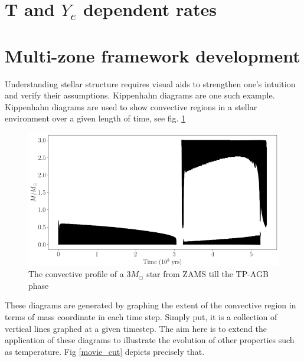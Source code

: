\documentclass{article}
\begin{document}
\section*{T and $Y_{e}$ dependent rates}

\section*{Multi-zone framework development}

Understanding stellar structure requires visual aids to strengthen one's intuition and verify their assumptions. Kippenhahn diagrams 
are one such example. Kippenhahn diagrams are used to show convective regions in a stellar environment over a given length of time, see
fig. \ref{conv}

\begin{figure}[H]
    \centerline{\includegraphics[scale = 0.5]{images/conv.png}}
    \caption{The convective profile of a 3$M_{\odot}$ star from ZAMS till the TP-AGB phase}
    \label{conv}
\end{figure}

These diagrams are generated by graphing the extent of the convective region in terms of mass coordinate in each time step. Simply 
put, it is a collection of vertical lines graphed at a given timestep. The aim here is to extend the application of these diagrams 
to illustrate the evolution of other properties such as temperature. Fig \ref{movie_cut} depicts precisely that.
\end{document}
